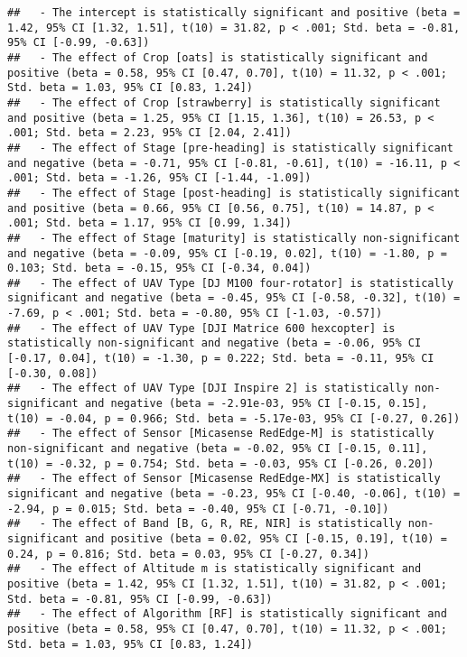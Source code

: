 \documentclass[
]{article}
\begin{document}
\begin{verbatim}
##   - The intercept is statistically significant and positive (beta = 1.42, 95% CI [1.32, 1.51], t(10) = 31.82, p < .001; Std. beta = -0.81, 95% CI [-0.99, -0.63])
##   - The effect of Crop [oats] is statistically significant and positive (beta = 0.58, 95% CI [0.47, 0.70], t(10) = 11.32, p < .001; Std. beta = 1.03, 95% CI [0.83, 1.24])
##   - The effect of Crop [strawberry] is statistically significant and positive (beta = 1.25, 95% CI [1.15, 1.36], t(10) = 26.53, p < .001; Std. beta = 2.23, 95% CI [2.04, 2.41])
##   - The effect of Stage [pre-heading] is statistically significant and negative (beta = -0.71, 95% CI [-0.81, -0.61], t(10) = -16.11, p < .001; Std. beta = -1.26, 95% CI [-1.44, -1.09])
##   - The effect of Stage [post-heading] is statistically significant and positive (beta = 0.66, 95% CI [0.56, 0.75], t(10) = 14.87, p < .001; Std. beta = 1.17, 95% CI [0.99, 1.34])
##   - The effect of Stage [maturity] is statistically non-significant and negative (beta = -0.09, 95% CI [-0.19, 0.02], t(10) = -1.80, p = 0.103; Std. beta = -0.15, 95% CI [-0.34, 0.04])
##   - The effect of UAV Type [DJ M100 four-rotator] is statistically significant and negative (beta = -0.45, 95% CI [-0.58, -0.32], t(10) = -7.69, p < .001; Std. beta = -0.80, 95% CI [-1.03, -0.57])
##   - The effect of UAV Type [DJI Matrice 600 hexcopter] is statistically non-significant and negative (beta = -0.06, 95% CI [-0.17, 0.04], t(10) = -1.30, p = 0.222; Std. beta = -0.11, 95% CI [-0.30, 0.08])
##   - The effect of UAV Type [DJI Inspire 2] is statistically non-significant and negative (beta = -2.91e-03, 95% CI [-0.15, 0.15], t(10) = -0.04, p = 0.966; Std. beta = -5.17e-03, 95% CI [-0.27, 0.26])
##   - The effect of Sensor [Micasense RedEdge-M] is statistically non-significant and negative (beta = -0.02, 95% CI [-0.15, 0.11], t(10) = -0.32, p = 0.754; Std. beta = -0.03, 95% CI [-0.26, 0.20])
##   - The effect of Sensor [Micasense RedEdge-MX] is statistically significant and negative (beta = -0.23, 95% CI [-0.40, -0.06], t(10) = -2.94, p = 0.015; Std. beta = -0.40, 95% CI [-0.71, -0.10])
##   - The effect of Band [B, G, R, RE, NIR] is statistically non-significant and positive (beta = 0.02, 95% CI [-0.15, 0.19], t(10) = 0.24, p = 0.816; Std. beta = 0.03, 95% CI [-0.27, 0.34])
##   - The effect of Altitude m is statistically significant and positive (beta = 1.42, 95% CI [1.32, 1.51], t(10) = 31.82, p < .001; Std. beta = -0.81, 95% CI [-0.99, -0.63])
##   - The effect of Algorithm [RF] is statistically significant and positive (beta = 0.58, 95% CI [0.47, 0.70], t(10) = 11.32, p < .001; Std. beta = 1.03, 95% CI [0.83, 1.24])

\end{verbatim}
\end{document}
